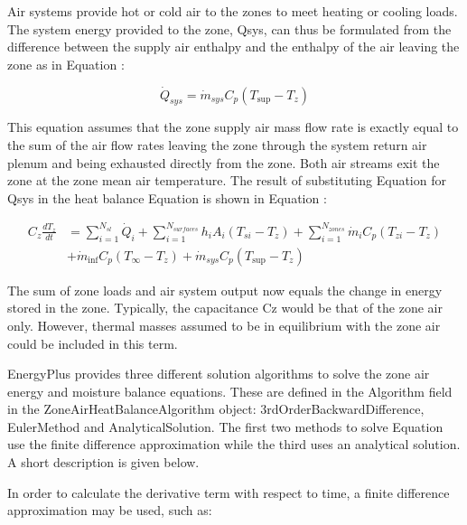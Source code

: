 Air systems provide hot or cold air to the zones to meet heating or cooling loads. The system energy provided to the zone, Qsys, can thus be formulated from the difference between the supply air enthalpy and the enthalpy of the air leaving the zone as in Equation :

\begin{equation}
{\dot Q_{sys}} = {\dot m_{sys}}{C_p}\left( {{T_{\sup }} - {T_z}} \right)
\end{equation}

This equation assumes that the zone supply air mass flow rate is exactly equal to the sum of the air flow rates leaving the zone through the system return air plenum and being exhausted directly from the zone. Both air streams exit the zone at the zone mean air temperature. The result of substituting Equation for Qsys in the heat balance Equation is shown in Equation :

\begin{equation}
\begin{array}{ll}
    {C_z}\frac{{d{T_z}}}{{dt}} & = \sum\limits_{i = 1}^{{N_{sl}}} {{{\dot Q}_i}}  + \sum\limits_{i = 1}^{{N_{surfaces}}} {{h_i}} {A_i}\left( {{T_{si}} - {T_z}} \right) + \sum\limits_{i = 1}^{{N_{zones}}} {{{\dot m}_i}} {C_p}\left( {{T_{zi}} - {T_z}} \right) \\
                               &+ {{\dot m}_{\inf }}{C_p}\left( {{T_\infty } - {T_z}} \right) + {{\dot m}_{sys}}{C_p}\left( {{T_{\sup }} - {T_z}} \right)
  \end{array}
\end{equation}

The sum of zone loads and air system output now equals the change in energy stored in the zone. Typically, the capacitance Cz would be that of the zone air only. However, thermal masses assumed to be in equilibrium with the zone air could be included in this term.

EnergyPlus provides three different solution algorithms to solve the zone air energy and moisture balance equations. These are defined in the Algorithm field in the ZoneAirHeatBalanceAlgorithm object: 3rdOrderBackwardDifference, EulerMethod and AnalyticalSolution. The first two methods to solve Equation use the finite difference approximation while the third uses an analytical solution. A short description is given below.

In order to calculate the derivative term with respect to time, a finite difference approximation may be used, such as:

